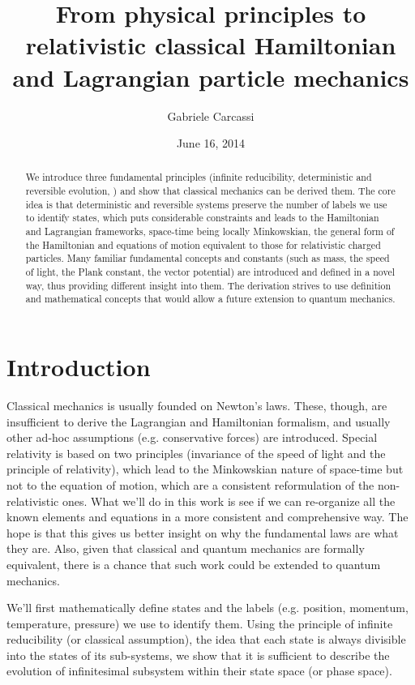 \documentclass[aps,pra,10pt,twocolumn,floatfix,nofootinbib]{revtex4-1}
\theoremstyle{definition}
\begin{document}
\title{From physical principles to relativistic classical Hamiltonian and Lagrangian particle mechanics}
\author{Gabriele Carcassi}
\date{June 16, 2014}

\begin{abstract}
We introduce three fundamental principles (infinite reducibility, deterministic and reversible evolution, ) and show that classical mechanics can be derived them. The core idea is that deterministic and reversible systems preserve the number of labels we use to identify states, which puts considerable constraints and leads to the Hamiltonian and Lagrangian frameworks, space-time being locally Minkowskian, the general form of the Hamiltonian and equations of motion equivalent to those for relativistic charged particles. Many familiar fundamental concepts and constants (such as mass, the speed of light, the Plank constant, the vector potential) are introduced and defined in a novel way, thus providing different insight into them. The derivation strives to use definition and mathematical concepts that would allow a future extension to quantum mechanics.\end{abstract}
\maketitle

\section{Introduction}
Classical mechanics is usually founded on Newton's laws. These, though, are insufficient to derive the Lagrangian and Hamiltonian formalism, and usually other ad-hoc assumptions (e.g. conservative forces) are introduced. Special relativity is based on two principles (invariance of the speed of light and the principle of relativity), which lead to the Minkowskian nature of space-time but not to the equation of motion, which are a consistent reformulation of the non-relativistic ones. What we'll do in this work is see if we can re-organize all the known elements and equations in a more consistent and comprehensive way. The hope is that this gives us better insight on why the fundamental laws are what they are. Also, given that classical and quantum mechanics are formally equivalent, there is a chance that such work could be extended to quantum mechanics.

We'll first mathematically define states and the labels (e.g. position, momentum, temperature, pressure) we use to identify them. Using the principle of infinite reducibility (or classical assumption), the idea that each state is always divisible into the states of its sub-systems, we show that it is sufficient to describe the evolution of infinitesimal subsystem within their state space (or phase space).
\end{document}
